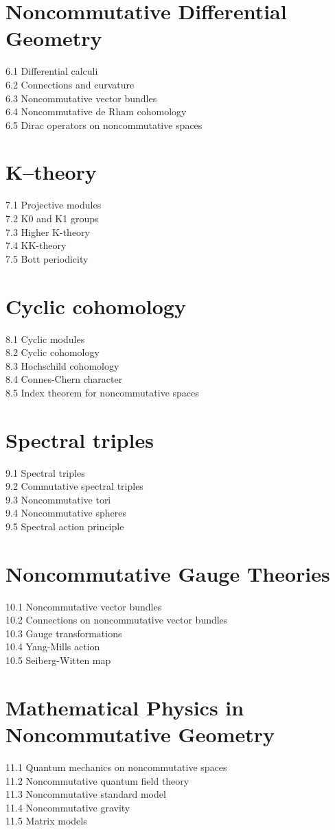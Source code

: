 \section{Noncommutative Differential Geometry}
6.1 Differential calculi\\
6.2 Connections and curvature\\
6.3 Noncommutative vector bundles\\
6.4 Noncommutative de Rham cohomology\\
6.5 Dirac operators on noncommutative spaces
\section{K–theory}
7.1 Projective modules\\
7.2 K0 and K1 groups\\
7.3 Higher K-theory\\
7.4 KK-theory\\
7.5 Bott periodicity
\section{Cyclic cohomology}
8.1 Cyclic modules\\
8.2 Cyclic cohomology\\
8.3 Hochschild cohomology\\
8.4 Connes-Chern character\\
8.5 Index theorem for noncommutative spaces
\section{Spectral triples}
9.1 Spectral triples\\
9.2 Commutative spectral triples\\
9.3 Noncommutative tori\\
9.4 Noncommutative spheres\\
9.5 Spectral action principle
\section{Noncommutative Gauge Theories}
10.1 Noncommutative vector bundles\\
10.2 Connections on noncommutative vector bundles\\
10.3 Gauge transformations\\
10.4 Yang-Mills action\\
10.5 Seiberg-Witten map
\section{Mathematical Physics in Noncommutative Geometry}
11.1 Quantum mechanics on noncommutative spaces\\
11.2 Noncommutative quantum field theory\\
11.3 Noncommutative standard model\\
11.4 Noncommutative gravity\\
11.5 Matrix models
